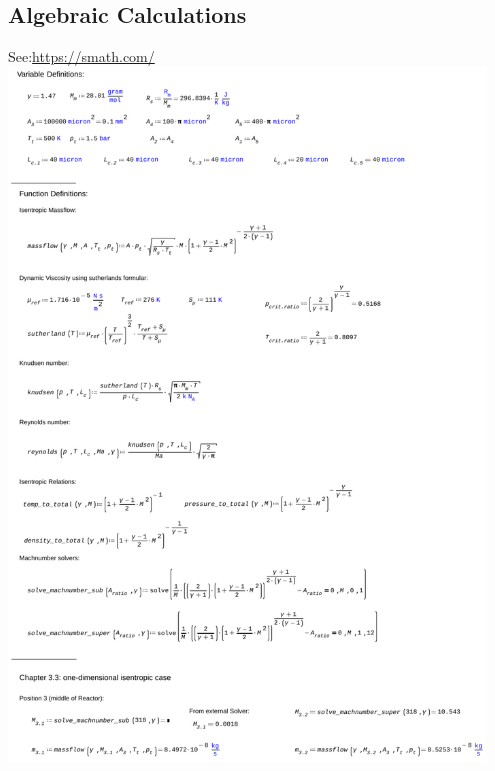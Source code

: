 \subsection{Algebraic Calculations}
\label{apx:smath}
See:\quad \url{https://smath.com/}\\

\includegraphics[page=1, width=0.95\textwidth]{code/calculations_thesis.pdf}
\newpage
